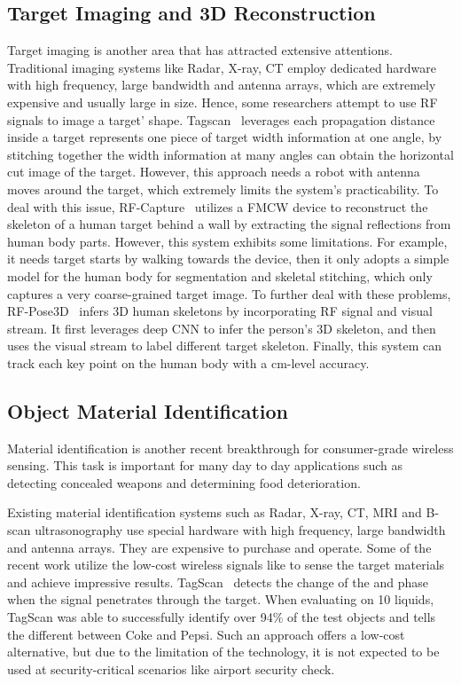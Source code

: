 \subsection{Target Imaging and 3D Reconstruction}

Target imaging is another area that has attracted extensive attentions. Traditional imaging systems like Radar, X-ray, CT employ dedicated
hardware with high frequency, large bandwidth and antenna arrays, which are extremely expensive and usually large in size. Hence, some
researchers attempt to use RF signals to image a target' shape. Tagscan~\cite{Tagscan} leverages each propagation distance inside a target
represents one piece of target width information at one angle, by stitching together the width information at many angles can obtain the
horizontal cut image of the target. However, this approach needs a robot with antenna moves around the target, which extremely limits the
system's practicability. To deal with this issue, RF-Capture~\cite{Adib2017Capturing} utilizes a FMCW device to reconstruct the skeleton of
a human target behind a wall by extracting the signal reflections from human body parts. However, this system exhibits some limitations.
For example, it needs target starts by walking towards the device, then it only adopts a simple model for the human body for segmentation
and skeletal stitching, which only captures a very coarse-grained target image. To further deal with these problems,
RF-Pose3D~\cite{zhao2018rf} infers 3D human skeletons by incorporating RF signal and visual stream. It first leverages deep CNN to infer
the person's 3D skeleton, and then uses the visual stream to label different target skeleton. Finally, this system can track each key point
on the human body with a cm-level accuracy.


\subsection{Object Material Identification}
Material identification is another recent breakthrough for consumer-grade wireless sensing. This task is important for many day to day
applications such as detecting concealed weapons and determining food deterioration.

Existing material identification systems such as Radar, X-ray, CT, MRI and B-scan ultrasonography use special hardware with high frequency,
large bandwidth and antenna arrays. They are expensive to purchase and operate. Some of the recent work utilize the low-cost wireless
signals like \RF to sense the target materials and achieve impressive results. TagScan~\cite{Tagscan} detects the change of the \RSSI and
phase when the \RF signal penetrates through the target. When evaluating on 10 liquids, TagScan was able to successfully identify over 94\%
of the test objects and tells the different between Coke and Pepsi. Such an approach offers a low-cost alternative, but due to the
limitation of the technology, it is not expected to be used at security-critical scenarios like airport security check.


